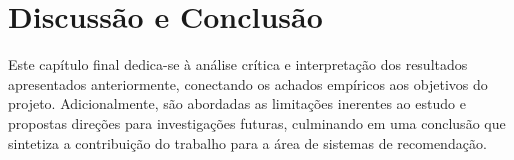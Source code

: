 
\chapter{Discussão e Conclusão}
\label{chap:discussao_conclusao}

Este capítulo final dedica-se à análise crítica e interpretação dos resultados apresentados anteriormente, conectando os achados empíricos aos objetivos do projeto. Adicionalmente, são abordadas as limitações inerentes ao estudo e propostas direções para investigações futuras, culminando em uma conclusão que sintetiza a contribuição do trabalho para a área de sistemas de recomendação.





